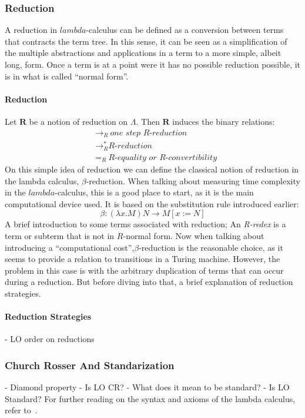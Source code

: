\documentclass[12pt]{article}
\begin{document}
\subsubsection{Reduction}
\label{reduction}
A reduction in $lambda$-calculus can be defined as a conversion between terms that contracts the term tree. In this sense, it can be seen as a simplification of the multiple abstractions and applications in a term to a more simple, albeit long, form. Once a term is at a point were it has no possible reduction possible, it is in what is called \enquote{normal form}.
\paragraph{Reduction} Let $\textbf{R}$ be a notion of reduction on $\Lambda$. Then $\textbf{R}$ induces the binary relations:
\begin{equation}
  \begin{split}
          &{\rightarrow}_{R} \ \textit{one step R-reduction} \\
          &\rightarrow_{R}^{*} \textit{R-reduction} \\
          &=_{R} \ \textit{R-equality or R-convertibility}
  \end{split}
\end{equation}
On this simple idea of reduction we can define the classical notion of reduction in the lambda calculus, $\beta$-reduction. When talking about measuring time complexity in the $lambda$-calculus, this is a good place to start, as it is the main computational device used.
It is based on the substitution rule introduced earlier:
\begin{equation}
  \beta : ( \lambda x.M ) N \rightarrow M [ x:=N ]
\end{equation}
A brief introduction to some terms associated with reduction; An \textit{R-redex} is a term or subterm that is not in $R$-normal form.
Now when talking about introducing a \enquote{computational cost},$\beta$-reduction is the reasonable choice, as it seems to provide a relation to transitions in a Turing machine. However, the problem in this case is with the arbitrary duplication of terms that can occur during a reduction.
But before diving into that, a brief explanation of reduction strategies.
\paragraph{Reduction Strategies}
- LO order on reductions
\subsubsection{Church Rosser And Standarization}
- Diamond property - Is LO CR?
- What does it mean to be standard? - Is LO Standard?
For further reading on the syntax and axioms of the lambda calculus, refer to~\cite{barendregt1984lambda}.
\end{document}
